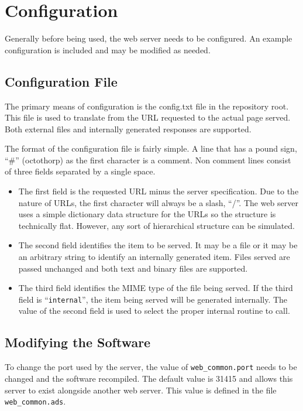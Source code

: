 \documentclass[10pt, openany, draft]{article}
\begin{document}
\section{Configuration}
Generally before being used, the web server needs to be configured.  An example configuration is included and may be modified as needed.

\subsection{Configuration File}
The primary means of configuration is the config.txt file in the repository root.  This file is used to translate from the URL requested to the actual page served.  Both external files and internally generated responses are supported.

The format of the configuration file is fairly simple.  A line that has a pound sign, ``\#'' (octothorp) as the first character is a comment.  Non comment lines consist of three fields separated by a single space.
\begin{itemize}
  \item The first field is the requested URL minus the server specification.  Due to the nature of URLs, the first character will always be a slash, ``/''.  The web server uses a simple dictionary data structure for the URLs so the structure is technically flat.  However, any sort of hierarchical structure can be simulated.
  \item The second field identifies the item to be served.  It may be a file or it may be an arbitrary string to identify an internally generated item.  Files served are passed unchanged and both text and binary files are supported.
  \item The third field identifies the MIME type of the file being served.  If the third field is ``\texttt{internal}'', the item being served will be generated internally.  The value of the second field is used to select the proper internal routine to call.
\end{itemize}

\subsection{Modifying the Software}
To change the port used by the server, the value of \texttt{web\_common.port} needs to be changed and the software recompiled.  The default value is 31415 and allows this server to exist alongside another web server.  This value is defined in the file \texttt{web\_common.ads}.
\end{document}

